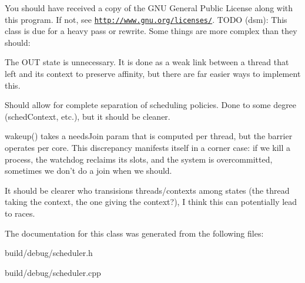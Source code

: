 You should have received a copy of the G\-N\-U General Public License along with this program. If not, see \href{http://www.gnu.org/licenses/}{\tt http\-://www.\-gnu.\-org/licenses/}. T\-O\-D\-O (dsm)\-: This class is due for a heavy pass or rewrite. Some things are more complex than they should\-:
\begin{DoxyItemize}
\item The O\-U\-T state is unnecessary. It is done as a weak link between a thread that left and its context to preserve affinity, but there are far easier ways to implement this.
\item Should allow for complete separation of scheduling policies. Done to some degree (sched\-Context, etc.), but it should be cleaner.
\item wakeup() takes a needs\-Join param that is computed per thread, but the barrier operates per core. This discrepancy manifests itself in a corner case\-: if we kill a process, the watchdog reclaims its slots, and the system is overcommitted, sometimes we don't do a join when we should.
\item It should be clearer who transisions threads/contexts among states (the thread taking the context, the one giving the context?), I think this can potentially lead to races. 
\end{DoxyItemize}

The documentation for this class was generated from the following files\-:\begin{DoxyCompactItemize}
\item 
build/debug/scheduler.\-h\item 
build/debug/scheduler.\-cpp\end{DoxyCompactItemize}
